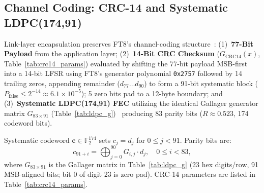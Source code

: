\subsection{Channel Coding: CRC-14 and Systematic LDPC(174,91)}
\label{sec:crc14}
\label{sec:ldpc}

Link-layer encapsulation preserves FT8's channel-coding structure~\cite{ft8}:
(1)~\textbf{77-Bit Payload} from the application layer;
(2)~\textbf{14-Bit CRC Checksum} ($G_{\text{CRC14}}(x)$, Table~\ref{tab:crc14_params}) evaluated by shifting the 77-bit payload MSB-first into a 14-bit LFSR using FT8's generator polynomial \texttt{0x2757} followed by 14 trailing zeros, appending remainder ($d_{77}\dots d_{90}$) to form a 91-bit systematic block ($P_{\text{false}} \le 2^{-14} \approx 6.1\times 10^{-5}$); 5 zero bits pad to a 12-byte boundary; and
(3)~\textbf{Systematic LDPC(174,91) FEC} utilizing the identical Gallager generator matrix $G_{83\times 91}$ (Table~\ref{tab:ldpc_g})~\cite{ft8,gallager} producing 83 parity bits ($R \approx 0.523$, 174 codeword bits).

Systematic codeword $\mathbf{c} \in \mathbb{F}_2^{174}$ sets $c_j = d_j$ for $0 \le j < 91$. Parity bits are:
\begin{equation}
  c_{91+i} = \bigoplus_{j=0}^{90} G_{i, j} \cdot d_j, \quad 0 \le i < 83,
\end{equation}
where $G_{83 \times 91}$ is the Gallager matrix in Table~\ref{tab:ldpc_g} (23 hex digits/row, 91 MSB-aligned bits; bit 0 of digit 23 is zero pad). CRC-14 parameters are listed in Table~\ref{tab:crc14_params}.

